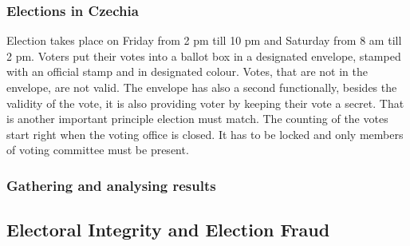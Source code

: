\subsubsection*{Elections in Czechia}

Election takes place on Friday from 2 pm till 10 pm and Saturday from 8 am till 2 pm. Voters put their votes into a ballot box in a designated envelope, stamped with an official stamp and in designated colour. Votes, that are not in the envelope, are not valid. The envelope has also a second functionally, besides the validity of the vote, it is also providing voter by keeping their vote a secret. That is another important principle election must match. The counting of the votes start right when the voting office is closed. It has to be locked and only members of voting committee must be present. \cite{volby}


\subsubsection*{Gathering and analysing results}













\subsection{Electoral Integrity and Election Fraud}

